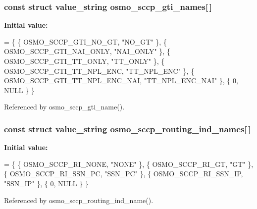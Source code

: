 \subsubsection[{osmo\+\_\+sccp\+\_\+gti\+\_\+names}]{\setlength{\rightskip}{0pt plus 5cm}const struct value\+\_\+string osmo\+\_\+sccp\+\_\+gti\+\_\+names[$\,$]}\label{sccp__sap_8c_ae1bde590c466d405e70b9b804527c1ad}
{\bfseries Initial value\+:}
\begin{DoxyCode}
= \{
        \{ OSMO_SCCP_GTI_NO_GT,          \textcolor{stringliteral}{"NO\_GT"} \},
        \{ OSMO_SCCP_GTI_NAI_ONLY,       \textcolor{stringliteral}{"NAI\_ONLY"} \},
        \{ OSMO_SCCP_GTI_TT_ONLY,        \textcolor{stringliteral}{"TT\_ONLY"} \},
        \{ OSMO_SCCP_GTI_TT_NPL_ENC,     \textcolor{stringliteral}{"TT\_NPL\_ENC"} \},
        \{ OSMO_SCCP_GTI_TT_NPL_ENC_NAI, \textcolor{stringliteral}{"TT\_NPL\_ENC\_NAI"} \},
        \{ 0, NULL \}
\}
\end{DoxyCode}


Referenced by osmo\+\_\+sccp\+\_\+gti\+\_\+name().

\subsubsection[{osmo\+\_\+sccp\+\_\+routing\+\_\+ind\+\_\+names}]{\setlength{\rightskip}{0pt plus 5cm}const struct value\+\_\+string osmo\+\_\+sccp\+\_\+routing\+\_\+ind\+\_\+names[$\,$]}\label{sccp__sap_8c_a7d2dbcc6dbd2e8f75fb6e75ba2bfe28b}
{\bfseries Initial value\+:}
\begin{DoxyCode}
= \{
        \{ OSMO_SCCP_RI_NONE,    \textcolor{stringliteral}{"NONE"} \},
        \{ OSMO_SCCP_RI_GT,      \textcolor{stringliteral}{"GT"} \},
        \{ OSMO_SCCP_RI_SSN_PC,  \textcolor{stringliteral}{"SSN\_PC"} \},
        \{ OSMO_SCCP_RI_SSN_IP,  \textcolor{stringliteral}{"SSN\_IP"} \},
        \{ 0, NULL \}
\}
\end{DoxyCode}


Referenced by osmo\+\_\+sccp\+\_\+routing\+\_\+ind\+\_\+name().

